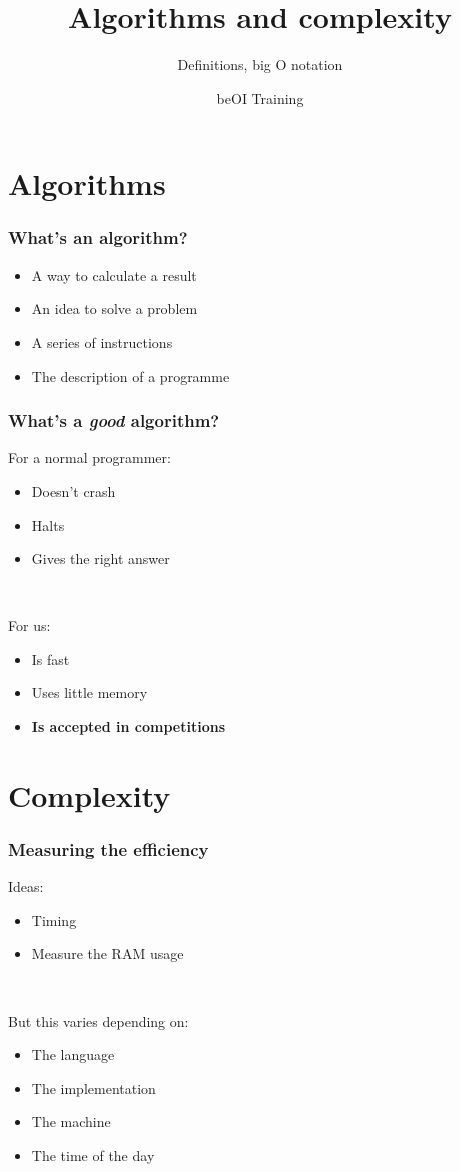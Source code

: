 \documentclass[12pt]{beamer}
\title{Algorithms and complexity}
\subtitle{Definitions, big O notation}
\author{beOI Training}
\institute{\texttt{[image: ../share/beoi-logo]}}
\begin{document}
\frame{\titlepage}

\section{Algorithms}

\begin{frame}
\frametitle{What's an algorithm?}
\begin{itemize}
\item A way to calculate a result
\item An idea to solve a problem
\item A series of instructions
\item The description of a programme
\end{itemize}
\end{frame}

\begin{frame}
\frametitle{What's a \emph{good} algorithm?}
For a normal programmer:
\begin{itemize}
\item Doesn't crash
\item Halts
\item Gives the right answer
\end{itemize}

~

For us:
\begin{itemize}
\item Is fast
\item Uses little memory
\item \textbf{Is accepted in competitions}
\end{itemize}
\end{frame}

\section{Complexity}

\begin{frame}
\frametitle{Measuring the efficiency}
Ideas:
\begin{itemize}
\item Timing
\item Measure the RAM usage
\end{itemize}

~

But this varies depending on:
\begin{itemize}
\item The language
\item The implementation
\item The machine
\item The time of the day
\end{itemize}
\end{frame}
\end{document}
